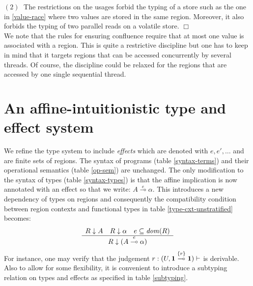 \documentclass[11pt]{article}
\newcommand{\Proofitem}[1]{\medskip \noindent $#1\;$}
\newcommand{\qed}{\hfill${\Box}$}
\newcommand{\Gives}{\vdash}             \newcommand{\IGives}{\vdash_{I}}        \newcommand{\AIGives}{\vdash_{{\it AI}}} \newcommand{\CGives}{\vdash_{C}}
\newcommand{\limpe}[1]{\stackrel{#1}{\multimap}}
\newcommand{\hyp}[3]{#1:(#2, #3)}
\newcommand{\infer}[2]{\begin{array}{c} #1 \\ \hline #2 \end{array}}
\newcommand{\set}[1]{\{#1\}}
\begin{document}
\Proofitem{(2)} The restrictions on the usages forbid the typing of
a store such as the one in \ref{value-race}  where two values are stored
in the same region. Moreover, it also forbids the typing of two parallel reads
on a volatile store. \qed \\


We note that the rules for ensuring confluence require that at most
one value is associated with a region. This is quite a restrictive
discipline but one has to keep in mind that it targets regions that
can be accessed concurrently by several threads. Of course, the
discipline could be relaxed for the regions that are accessed by one
single sequential thread.


\section{An affine-intuitionistic type and effect system}
\label{aitype-effect-sec}
We refine the type system to include {\em effects} which are
denoted with $e,e',\ldots$ and are finite sets of regions.
The syntax of programs (table \ref{syntax-terms}) and their 
operational semantics (table \ref{op-sem}) are unchanged.
The only modification to the syntax of types (table \ref{syntax-types}) is that 
the affine implication is now annotated with an effect
so that we write:
$A\limpe{e}\alpha$.
This introduces a new dependency
of types on regions and consequently the compatibility condition between
region contexts and functional types in table \ref{type-cxt-unstratified} 
becomes:
\[
\infer{R\dcl A\quad R\dcl \alpha \quad e\subseteq \w{dom}(R)}
{R\dcl (A\limpe{e} \alpha)}
\]
For instance, one may verify that the judgement $\hyp{r}{U}{\tertype \limpe{\set{r}} \tertype}\Gives $ is 
derivable.
Also to allow for some flexibility, it is convenient to introduce a
subtyping relation on types and effects as specified in table \ref{subtyping}.
\end{document}
